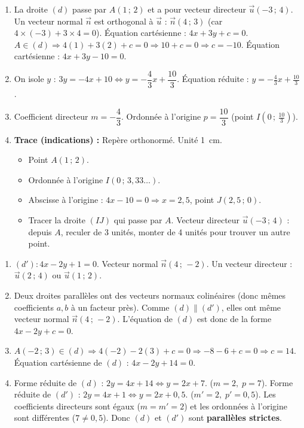 \documentclass[11pt]{article}
\begin{document}
\begin{corrige}
\begin{enumerate}
\item La droite $(d)$ passe par $A(1\,;\,2)$ et a pour vecteur directeur $\vec{u}(-3\,;\,4)$.
Un vecteur normal $\vec{n}$ est orthogonal à $\vec{u}$ : $\vec{n}(4\,;\,3)$ (car $4\times(-3)+3\times4=0$).
Équation cartésienne : $4x + 3y + c = 0$.
$A \in (d) \Rightarrow 4(1) + 3(2) + c = 0 \Rightarrow 10 + c = 0 \Rightarrow c = -10$.
Équation cartésienne : $\boxed{4x + 3y - 10 = 0}$.
\item On isole $y$ : $3y = -4x + 10 \iff y = -\dfrac{4}{3}x + \dfrac{10}{3}$.
Équation réduite : $\boxed{y = -\frac{4}{3}x + \frac{10}{3}}$.
\item Coefficient directeur $m = -\dfrac{4}{3}$. Ordonnée à l'origine $p = \dfrac{10}{3}$ (point $I\left(0\,;\,\frac{10}{3}\right)$).
\item \textbf{Trace (indications) :} Repère orthonormé. Unité \SI{1}{cm}.
\begin{itemize}
\item Point $A(1\,;\,2)$.
\item Ordonnée à l'origine $I(0\,;\,3,33\ldots)$.
\item Abscisse à l'origine : $4x - 10 = 0 \Rightarrow x = 2,5$, point $J(2,5\,;\,0)$.
\item Tracer la droite $(IJ)$ qui passe par $A$. Vecteur directeur $\vec{u}(-3\,;\,4)$ : depuis $A$, reculer de 3 unités, monter de 4 unités pour trouver un autre point.
\end{itemize}
\end{enumerate}
\end{corrige}

\begin{corrige}
\begin{enumerate}
\item $(d') : 4x - 2y + 1 = 0$. Vecteur normal $\vec{n}(4\,;\,-2)$. Un vecteur directeur : $\vec{u}(2\,;\,4)$ ou $\vec{u}(1\,;\,2)$.
\item Deux droites parallèles ont des vecteurs normaux colinéaires (donc mêmes coefficients $a,b$ à un facteur près). Comme $(d) \parallel (d')$, elles ont même vecteur normal $\vec{n}(4\,;\,-2)$. L'équation de $(d)$ est donc de la forme $4x - 2y + c = 0$.
\item $A(-2\,;\,3) \in (d) \Rightarrow 4(-2) - 2(3) + c = 0 \Rightarrow -8 - 6 + c = 0 \Rightarrow c = 14$.
Équation cartésienne de $(d)$ : $\boxed{4x - 2y + 14 = 0}$.
\item Forme réduite de $(d)$ : $2y = 4x + 14 \iff y = 2x + 7$. ($m=2,\; p=7$).
Forme réduite de $(d')$ : $2y = 4x + 1 \iff y = 2x + 0,5$. ($m'=2,\; p'=0,5$).
Les coefficients directeurs sont égaux ($m=m'=2$) et les ordonnées à l'origine sont différentes ($7 \neq 0,5$).
Donc $(d)$ et $(d')$ sont \textbf{parallèles strictes}.
\end{enumerate}
\end{corrige}
\end{document}
